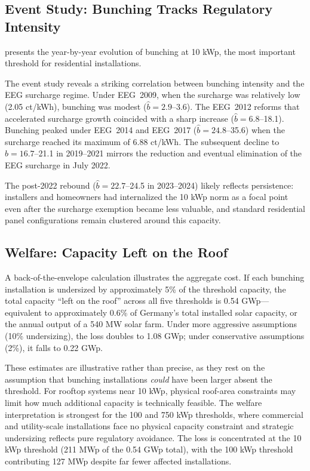 \documentclass[12pt]{article}
\begin{document}
\subsection{Event Study: Bunching Tracks Regulatory Intensity}

 presents the year-by-year evolution of bunching at 10 kWp, the most important threshold for residential installations.



The event study reveals a striking correlation between bunching intensity and the EEG surcharge regime. Under EEG~2009, when the surcharge was relatively low (2.05 ct/kWh), bunching was modest ($\hat{b} = 2.9$--3.6). The EEG~2012 reforms that accelerated surcharge growth coincided with a sharp increase ($\hat{b} = 6.8$--18.1). Bunching peaked under EEG~2014 and EEG~2017 ($\hat{b} = 24.8$--35.6) when the surcharge reached its maximum of 6.88 ct/kWh. The subsequent decline to $\hat{b} = 16.7$--21.1 in 2019--2021 mirrors the reduction and eventual elimination of the EEG surcharge in July 2022.

The post-2022 rebound ($\hat{b} = 22.7$--24.5 in 2023--2024) likely reflects persistence: installers and homeowners had internalized the 10 kWp norm as a focal point even after the surcharge exemption became less valuable, and standard residential panel configurations remain clustered around this capacity.

\subsection{Welfare: Capacity Left on the Roof}

A back-of-the-envelope calculation illustrates the aggregate cost. If each bunching installation is undersized by approximately 5\% of the threshold capacity, the total capacity ``left on the roof'' across all five thresholds is 0.54 GWp---equivalent to approximately 0.6\% of Germany's total installed solar capacity, or the annual output of a 540 MW solar farm. Under more aggressive assumptions (10\% undersizing), the loss doubles to 1.08 GWp; under conservative assumptions (2\%), it falls to 0.22 GWp.

These estimates are illustrative rather than precise, as they rest on the assumption that bunching installations \textit{could} have been larger absent the threshold. For rooftop systems near 10 kWp, physical roof-area constraints may limit how much additional capacity is technically feasible. The welfare interpretation is strongest for the 100 and 750 kWp thresholds, where commercial and utility-scale installations face no physical capacity constraint and strategic undersizing reflects pure regulatory avoidance. The loss is concentrated at the 10 kWp threshold (211 MWp of the 0.54 GWp total), with the 100 kWp threshold contributing 127 MWp despite far fewer affected installations.
\end{document}
